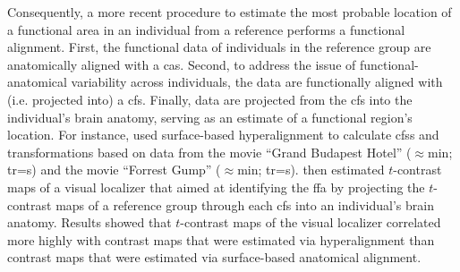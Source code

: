Consequently, a more recent procedure \citep[e.g.,][]{jiahui2020predicting,
guntupalli2016model, haxby2011common} to estimate the most probable location of
a functional area in an individual from a reference performs a functional
alignment.
First, the functional data of individuals in the reference group are
anatomically aligned with a \ac{cas}.
%
Second, to address the issue of functional-anatomical variability across
individuals, the data are functionally aligned with (i.e. projected into) a
\ac{cfs}.
%
Finally, data are projected from the \ac{cfs} into the individual's
brain anatomy, serving as an estimate of a functional region's location.
For instance, \citet{jiahui2020predicting} used surface-based hyperalignment to
calculate \acp{cfs} and transformations based on data from
%
the movie ``Grand Budapest Hotel'' ($\approx$\unit[50]{min};
\ac{tr}=\unit[1]{s}) and
%
the movie ``Forrest Gump'' ($\approx$\unit[120]{min}; \ac{tr}=\unit[2]{s}).
%
\citet{jiahui2020predicting} then estimated $t$-contrast maps of a visual
localizer that aimed at identifying the \ac{ffa} by projecting the $t$-contrast
maps of a reference group through each \ac{cfs} into an individual's brain
anatomy.
%
Results showed that $t$-contrast maps of the visual localizer correlated more
highly with contrast maps that were estimated via hyperalignment than contrast
maps that were estimated via surface-based anatomical alignment.





